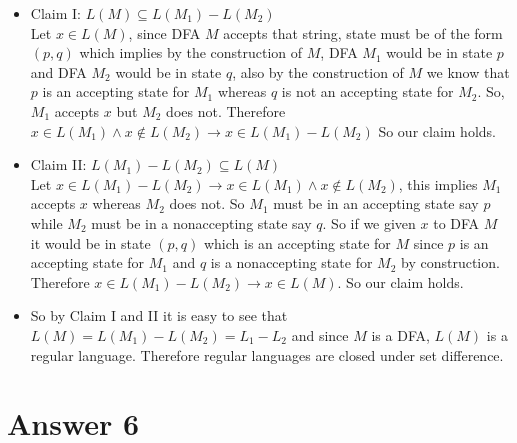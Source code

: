 \documentclass[12pt]{article}
\begin{document}
\begin{itemize}
	\item Claim I: $L(M)\subseteq L(M_1)-L(M_2)$\\
		Let $x\in L(M)$, since DFA $M$ accepts that string, state must be of the form $(p,q)$
		which implies by the construction of $M$, DFA $M_1$ would be in state $p$ and DFA $M_2$
		would be in state $q$, also by the construction of $M$ we know that $p$ is an accepting
		state for $M_1$ whereas $q$ is not an accepting state for $M_2$. So, $M_1$ accepts $x$
		but $M_2$ does not. Therefore $x\in L(M_1) \wedge x\notin L(M_2)\rightarrow x\in L(M_1)-L(M_2)$
		So our claim holds.
	\item Claim II: $L(M_1)-L(M_2)\subseteq L(M)$\\
		Let $x\in L(M_1)-L(M_2)\rightarrow x\in L(M_1) \wedge x\notin L(M_2)$, this implies $M_1$
		accepts $x$ whereas $M_2$ does not. So $M_1$ must be in an accepting state say $p$ while
		$M_2$ must be in a nonaccepting state say $q$. So if we given $x$ to DFA $M$ it would be
		in state $(p,q)$ which is an accepting state for $M$ since $p$ is an accepting state for
		$M_1$ and $q$ is a nonaccepting state for $M_2$ by construction. Therefore
		$x\in L(M_1)-L(M_2)\rightarrow x\in L(M)$. So our claim holds.
	\item So by Claim I and II it is easy to see that $L(M)=L(M_1)-L(M_2)=L_1-L_2$ and since $M$
		is a DFA, $L(M)$ is a regular language. Therefore regular languages are closed under set
		difference.
\end{itemize}

\section*{Answer 6}
\end{document}
